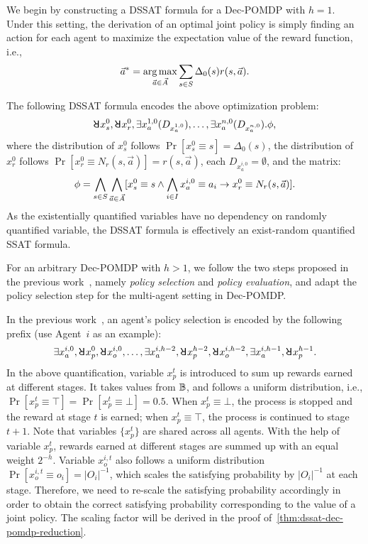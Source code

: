 We begin by constructing a DSSAT formula for a Dec-POMDP with $h=1$.
Under this setting,
the derivation of an optimal joint policy is simply finding an action for each agent to maximize the expectation value of the reward function, i.e.,
\begin{align*}
    \vec{a}^*=\operatorname*{arg\,max}_{\vec{a}\in \vec{A}}\sum_{s\in S}\Delta_0(s)r(s,\vec{a}).
\end{align*}

The following DSSAT formula encodes the above optimization problem:
\begin{align*}
    \random{} x_s^0,\random{} x_r^0,\exists x_a^{1,0}(D_{x_a^{1,0}}),\ldots,\exists x_a^{n,0}(D_{x_a^{n,0}}).\pf,
\end{align*}
where the distribution of $x_s^0$ follows $\Pr[x_s^0 \equiv s]=\Delta_0(s)$,
the distribution of $x_r^0$ follows $\Pr[x_r^0 \equiv N_r(s,\vec{a})]=r(s,\vec{a})$,
each $D_{x_a^{i,0}}=\emptyset$, and the matrix:
\begin{align*}
    \phi=\bigwedge_{s\in S}\bigwedge_{\vec{a}\in\vec{A}}[x_s^0\equiv s\wedge\bigwedge_{i\in I} x_a^{i,0}\equiv a_i\rightarrow x_r^0\equiv N_r(s,\vec{a})].
\end{align*}
As the existentially quantified variables have no dependency on randomly quantified variable,
the DSSAT formula is effectively an exist-random quantified SSAT formula.

For an arbitrary Dec-POMDP with $h>1$,
we follow the two steps proposed in the previous work~\cite{Salmon2020},
namely \textit{policy selection} and \textit{policy evaluation},
and adapt the policy selection step for the multi-agent setting in Dec-POMDP.

In the previous work~\cite{Salmon2020},
an agent's policy selection is encoded by the following prefix (use Agent~$i$ as an example):
\begin{align*}
    \exists x_a^{i,0},\random{} x_p^0,\random{} x_o^{i,0},\ldots,\exists x_a^{i,h-2},\random{} x_p^{h-2},\random{} x_o^{i,h-2},\exists x_a^{i,h-1},\random{} x_p^{h-1}.
\end{align*}
In the above quantification,
variable $x_p^t$ is introduced to sum up rewards earned at different stages.
It takes values from $\mathbb{B}$,
and follows a uniform distribution,
i.e., $\Pr[x_p^t\equiv\top]=\Pr[x_p^t\equiv\bot]=0.5$.
When $x_p^t\equiv\bot$,
the process is stopped and the reward at stage $t$ is earned;
when $x_p^t\equiv\top$,
the process is continued to stage $t+1$.
Note that variables $\{x_p^t\}$ are shared across all agents.
With the help of variable $x_p^t$,
rewards earned at different stages are summed up with an equal weight $2^{-h}$.
Variable $x_o^{i,t}$ also follows a uniform distribution $\Pr[x_o^{i,t} \equiv o_i]=|O_i|^{-1}$,
which scales the satisfying probability by $|O_i|^{-1}$ at each stage.
Therefore, we need to re-scale the satisfying probability accordingly in order to obtain the correct satisfying probability corresponding to the value of a joint policy.
The scaling factor will be derived in the proof of~\cref{thm:dssat-dec-pomdp-reduction}.

